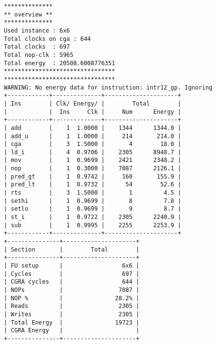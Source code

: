\documentclass[oneside,11pt,accentcolor=tud2b, nochapname]{tudexercise}
\begin{document}
\begin{lstlisting}[caption={Endausgabe für das Ziel Energy-Min (Instanz 6x6++) },captionpos=b, float, label={lst:energy}]
**************
** overview **
**************
Used instance : 6x6
Total clocks on cga : 644
Total clocks  : 697
Total nop-clk : 5965 
Total energy  : 20508.6008776351
********************************
********************************
WARNING: No energy data for instruction: intr12_gp. Ignoring
+------------+--------------+---------------------+
| Ins        | Clk/ Energy/ |        Total        |
|            |  Ins     Clk |     Num      Energy |
+------------+--------------+---------------------+
| add        |    1  1.0000 |    1344      1344.0 |
| add_u      |    1  1.0000 |     214       214.0 |
| cga        |    3  1.5000 |       4        18.0 |
| ld_i       |    4  0.9706 |    2305      8948.7 |
| mov        |    1  0.9699 |    2421      2348.2 |
| nop        |    1  0.3000 |    7087      2126.1 |
| pred_gt    |    1  0.9742 |     160       155.9 |
| pred_lt    |    1  0.9732 |      54        52.6 |
| rts        |    3  1.5000 |       1         4.5 |
| sethi      |    1  0.9699 |       8         7.8 |
| setlo      |    1  0.9699 |       9         8.7 |
| st_i       |    1  0.9722 |    2305      2240.9 |
| sub        |    1  0.9995 |    2255      2253.9 |
+------------+--------------+---------------------+
+---------------+---------------------+
| Section       |        Total        |
+---------------+---------------------+
| FU setup      |                 6x6 |
| Cycles        |                 697 |
| CGRA cycles   |                 644 |
| NOPs          |                7087 |
| NOP %         |               28.2% |
| Reads         |                2305 |
| Writes        |                2305 |
| Total Energy  |               19723 |
| CGRA Energy   |                     |
+---------------+---------------------+
\end{lstlisting}
\end{document}
